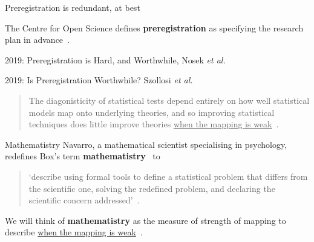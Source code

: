 \documentclass{beamer}
\begin{document}
\begin{frame}{Preregistration is redundant, at best}

The Centre for Open Science defines \textbf{preregistration} as specifying the research plan in advance~\cite{centre_for_open_science_preregistration_2020}.

\vspace{1cm}

2019: Preregistration is Hard, and Worthwhile, Nosek \emph{et al.}~\cite{nosek_preregistration_2019}

\vspace{1cm}

2019: Is Preregistration Worthwhile? Szollosi \emph{et al.}~\cite{szollosi_preregistration_2019}

\bigskip

\begin{quote}
The diagonisticity of statistical tests depend entirely on how well statistical models map onto underlying theories, and so improving statistical techniques does little improve theories \underline{when the mapping is weak}~\cite{szollosi_preregistration_2019}.
\end{quote}


\end{frame}

\begin{frame}{Mathematistry}
Navarro, a mathematical scientist specialising in psychology, redefines Box's term \textbf{mathematistry}~\cite{box_science_1976} to

\bigskip

\begin{quote}
`describe using formal tools to define a statistical problem that differs from the
scientific one, solving the redefined problem, and declaring the scientific concern addressed'~\cite{navarro_between_2018}.
\end{quote}

\bigskip

We will think of \textbf{mathematistry} as the measure of strength of mapping to describe \underline{when the mapping is weak}~\cite{szollosi_preregistration_2019}.


\end{frame}
\end{document}
